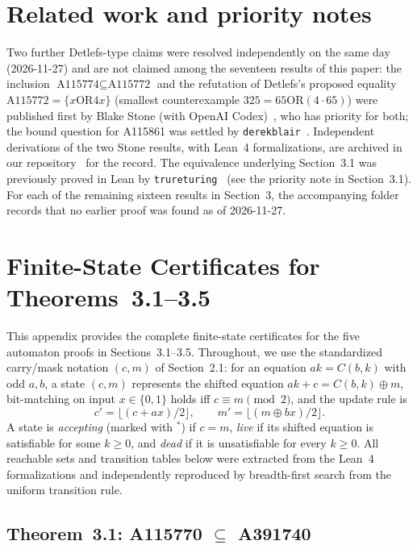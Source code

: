 \documentclass[11pt]{article}
\begin{document}
\section{Related work and priority notes}
\label{sec:related}
Two further Detlefs-type claims were resolved independently on the same day (2026-11-27) and are not claimed among the seventeen results of this paper: the inclusion $\text{A115774} \subseteq \text{A115772}$ and the refutation of Detlefs's proposed equality $\text{A115772} = \{x \mathbin{\mathrm{OR}} 4x\}$ (smallest counterexample $325 = 65 \mathbin{\mathrm{OR}} (4 \cdot 65)$) were published first by Blake Stone (with OpenAI Codex)~\cite{Stone2026}, who has priority for both; the bound question for A115861 was settled by \texttt{derekblair}~\cite{Derekblair2026}. Independent derivations of the two Stone results, with Lean~4 formalizations, are archived in our repository~\cite{Moto2026} for the record. The equivalence underlying Section~3.1 was previously proved in Lean by \texttt{trureturing}~\cite{trureturing2026} (see the priority note in Section~3.1). For each of the remaining sixteen results in Section~3, the accompanying folder records that no earlier proof was found as of 2026-11-27.

\appendix
\section{Finite-State Certificates for Theorems~3.1--3.5}
\label{app:automata}

This appendix provides the complete finite-state certificates for the five automaton proofs in Sections~3.1--3.5. Throughout, we use the standardized carry/mask notation $(c, m)$ of Section~2.1: for an equation $ak = C(b,k)$ with odd $a, b$, a state $(c, m)$ represents the shifted equation $ak + c = C(b,k) \oplus m$, bit-matching on input $x \in \{0,1\}$ holds iff $c \equiv m \pmod{2}$, and the update rule is
\[
  c' = \lfloor (c + ax)/2 \rfloor, \qquad m' = \lfloor (m \oplus bx)/2 \rfloor.
\]
A state is \emph{accepting} (marked with $^*$) if $c = m$, \emph{live} if its shifted equation is satisfiable for some $k \ge 0$, and \emph{dead} if it is unsatisfiable for every $k \ge 0$. All reachable sets and transition tables below were extracted from the Lean~4 formalizations and independently reproduced by breadth-first search from the uniform transition rule.

\subsection{Theorem~3.1: A115770 $\subseteq$ A391740}
\label{app:thm31}
\end{document}
